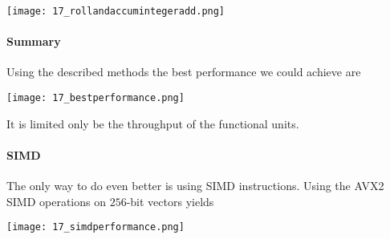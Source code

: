 \texttt{[image: 17\_rollandaccumintegeradd.png]}

\paragraph{Summary}
Using the described methods the best performance we could achieve are

\texttt{[image: 17\_bestperformance.png]}

It is limited only be the throughput of the functional units.

\paragraph{SIMD}
The only way to do even better is using SIMD instructions. Using the AVX2 SIMD operations on $256$-bit vectors yields

\texttt{[image: 17\_simdperformance.png]}

